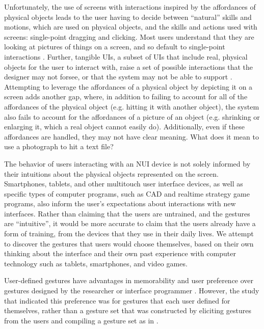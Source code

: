 Unfortunately, the use of screens with interactions inspired by the affordances of physical objects leads to the user having to decide between ``natural'' skills and motions, which are used on physical objects, and the skills and actions used with screens: single-point dragging and clicking. 
Most users understand that they are looking at pictures of things on a screen, and so default to single-point interactions \citep{vanacken2008ghosts}.
Further, tangible UIs, a subset of UIs that include real, physical objects for the user to interact with, raise a set of possible interactions that the designer may not forsee, or that the system may not be able to support \citep{hornecker2012beyond}.
Attempting to leverage the affordances of a physical object by depicting it on a screen adds another gap, where, in addition to failing to account for all of the affordances of the physical object (e.g. hitting it with another object), the system also fails to account for the affordances of a picture of an object (e.g. shrinking or enlarging it, which a real object cannot easily do). 
Additionally, even if these affordances are handled, they may not have clear meaning. 
What does it mean to use a photograph to hit a text file?

The behavior of users interacting with an NUI device is not solely informed by their intuitions about the physical objects represented on the screen. 
Smartphones, tablets, and other multitouch user interface devices, as well as specific types of computer programs, such as CAD and realtime strategy game programs, also inform the user's expectations about interactions with new interfaces. 
Rather than claiming that the users are untrained, and the gestures are ``intuitive'', it would be more accurate to claim that the users already have a form of training, from the devices that they use in their daily lives. 
We attempt to discover the gestures that users would choose themselves, based on their own thinking about the interface and their own past experience with computer technology such as tablets, smartphones, and video games. 

User-defined gestures have advantages in memorability and user preference over gestures designed by the researcher or interface programmer \citep{nacenta2013memorability}. 
However, the study that indicated this preference was for gestures that each user defined for themselves, rather than a gesture set that was constructed by eliciting gestures from the users and compiling a gesture set as in \citep{Micire:2009:ANG:1731903.1731912}. 

